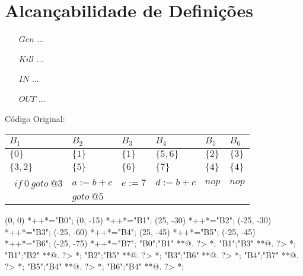 \section{Alcan\c{c}abilidade de Defini\c{c}\~oes}

\begin{itemize}
  \item[$Gen$] ...
  \item[$Kill$] ...
  \item[$IN$] ...
  \item[$OUT$] ...
\end{itemize}

C\'odigo Original:

\begin{table}[ht]
\begin{scriptsize}
\begin{tabular}{l|l|l|l|l|l}
$B_{1}$ & $B_{2}$ & $B_{3}$ & $B_{4}$ & $B_{5}$ & $B_{6}$ \\
\hline
$\{0\}$ & $\{1\}$ & $\{1\}$ & $\{5, 6\}$ & $\{2\}$ & $\{3\}$ \\
$\{3, 2\}$ & $\{5\}$ & $\{6\}$ & $\{7\}$ & $\{4\}$ & $\{4\}$ \\
\hline\
$if\:0\:goto\:@3$ & $a:=b+c$ & $e:=7$ & $d:=b+c$ & $nop$ & $nop$ \\
 & $goto\:@5$ &  &  &  &  \\
\end{tabular}
\end{scriptsize}
\end{table}

\begin{scriptsize}
\xy(0, 0)
	*++{}*\frm{-,}="B0";
(0, -15)
	*++{}*\frm{-,}="B1";
(25, -30)
	*++{}*\frm{-,}="B2";
(-25, -30)
	*++{}*\frm{-,}="B3";
(-25, -60)
	*++{}*\frm{-,}="B4";
(25, -45)
	*++{}*\frm{-,}="B5";
(-25, -45)
	*++{}*\frm{-,}="B6";
(-25, -75)
	*++{}*\frm{-,}="B7";
"B0";"B1" **@{.} ?> *{\dir{>}};
"B1";"B3" **@{.} ?> *{\dir{>}};
"B1";"B2" **@{.} ?> *{\dir{>}};
"B2";"B5" **@{.} ?> *{\dir{>}};
"B3";"B6" **@{.} ?> *{\dir{>}};
"B4";"B7" **@{.} ?> *{\dir{>}};
"B5";"B4" **@{.} ?> *{\dir{>}};
"B6";"B4" **@{.} ?> *{\dir{>}};
\endxy
\end{scriptsize}


